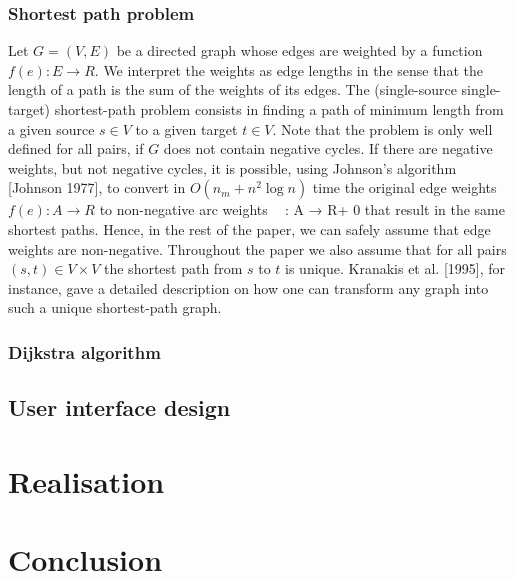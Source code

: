 \documentclass[thesis=M,english]{FITthesis}[2012/10/20]
\begin{document}
\subsection{Shortest path problem}
Let $G = (V, E)$ be a directed graph whose edges are weighted by a function $f(e): E \to R$. We interpret the weights as edge lengths in the sense that the length of a path is the sum of the weights of its edges. The (single-source single-target) shortest-path problem consists in finding a path of minimum length from a given source $s \in V$ to a given target $t \in V$. Note that the problem is only well defined for all pairs, if $G$ does not contain negative cycles. If there are negative weights, but not negative cycles, it is possible, using Johnson’s algorithm [Johnson 1977], to convert in $O(n_m + n^2 \log n)$ time the original edge weights $f(e): A \to R$ to non-negative arc weights  : A → R+ 0 that result in the same shortest paths. Hence, in the rest of the paper, we can safely assume that edge weights are non-negative. Throughout the paper we also assume that for all pairs $(s,t) \in V \times V $ the shortest path from $s$ to $t$ is unique. Kranakis et al. [1995], for instance, gave a detailed description on how one can transform any graph into such a unique shortest-path graph.


\subsection{Dijkstra algorithm}

\section{User interface design}

\chapter{Realisation}

\chapter{Conclusion}





\appendix
\end{document}

